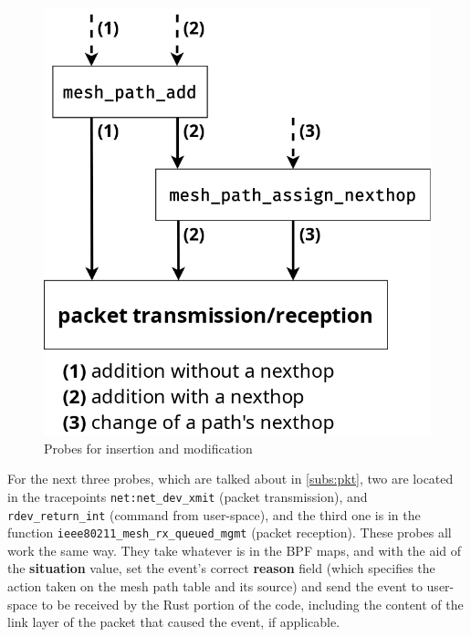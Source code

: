 \begin{figure}[htb]
   \centering
   \includegraphics[scale=.35]{action}
   \caption{Probes for insertion and modification}\label{fig:addmod}
\end{figure}

For the next three probes, which are talked about in \autoref{subs:pkt}, two are
located in the tracepoints \texttt{net:net\_dev\_xmit} (packet transmission),
and \texttt{rdev\_return\_int} (command from user-space), and the third one is
in the function \texttt{ieee80211\_mesh\_rx\_queued\_mgmt} (packet reception).
These probes all work the same way. They take whatever is in the BPF maps, and
with the aid of the \textbf{situation} value, set the event's correct
\textbf{reason} field (which specifies the action taken on the mesh path table
and its source) and send the event to user-space to be received by the Rust
portion of the code, including the content of the link layer of the packet that
caused the event, if applicable.


